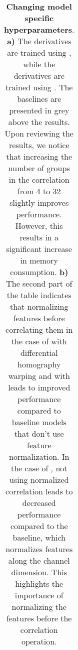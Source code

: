 \begin{table}[ht!]
\begin{adjustbox}{width=1\textwidth}
\begin{tabular}{|l
|c c
|c c
|c c
|c c
|c c
||c |c |c |c |c
|}
\hline
\end{tabular}
\end{adjustbox}
\caption[Changing model specific hyperparameters]{\textbf{Changing model specific hyperparameters}.
\textbf{a)} The {\mvsn} derivatives are trained using {\bms}, while the {\rmvd} derivatives are trained using {\brs}. The baselines are presented in grey above the results. Upon reviewing the results, we notice that increasing the number of groups in the {\gwc} correlation from 4 to 32 slightly improves performance. However, this results in a significant increase in memory consumption. \textbf{b)} The second part of the table indicates that normalizing features before correlating them in the case of {\mvsn} with differential homography warping and with {\gwc} leads to improved performance compared to baseline models that don't use feature normalization. In the case of {\rmvd}, not using normalized correlation leads to decreased performance compared to the baseline, which normalizes features along the channel dimension. This highlights the importance of normalizing the features before the correlation operation.}
\label{tab:hyp}

\end{table}

